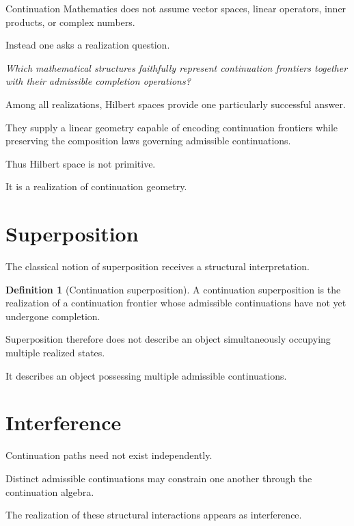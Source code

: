 \documentclass[13pt,openany]{book}
\theoremstyle{plain}
\theoremstyle{definition}
\newtheorem{definition}{Definition}[chapter]
\begin{document}
Continuation Mathematics does not assume vector spaces, linear operators,
inner products, or complex numbers.

Instead one asks a realization question.

\emph{Which mathematical structures faithfully represent continuation
frontiers together with their admissible completion operations?}

Among all realizations, Hilbert spaces provide one particularly successful
answer.

They supply a linear geometry capable of encoding continuation frontiers while
preserving the composition laws governing admissible continuations.

Thus Hilbert space is not primitive.

It is a realization of continuation geometry.

\section{Superposition}

The classical notion of superposition receives a structural interpretation.

\begin{definition}[Continuation superposition]
A continuation superposition is the realization of a continuation frontier
whose admissible continuations have not yet undergone completion.
\end{definition}

Superposition therefore does not describe an object simultaneously occupying
multiple realized states.

It describes an object possessing multiple admissible continuations.

\section{Interference}

Continuation paths need not exist independently.

Distinct admissible continuations may constrain one another through the
continuation algebra.

The realization of these structural interactions appears as interference.
\end{document}
